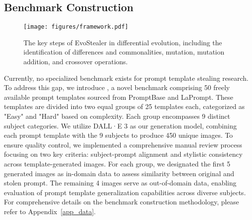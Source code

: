 \subsection{Benchmark Construction} \label{sec_data_collection}
\begin{figure*}
    \centering
    \texttt{[image: figures/framework.pdf]}
    \caption{The key steps of EvoStealer in differential evolution, including the identification of differences and commonalities, mutation, mutation addition, and crossover operations.}
    \label{fig:framework}
\end{figure*}

Currently, no specialized benchmark exists for prompt template stealing research. To address this gap, we introduce \data, a novel benchmark comprising 50 freely available prompt templates sourced from PromptBase and LaPrompt. These templates are divided into two equal groups of 25 templates each, categorized as "Easy" and "Hard" based on complexity. Each group encompasses 9 distinct subject categories.
We utilize DALL·E 3 as our generation model, combining each prompt template with the 9 subjects to produce 450 unique images.
To ensure quality control, we implemented a comprehensive manual review process focusing on two key criteria: subject-prompt alignment and stylistic consistency across template-generated images. For each group, we designated the first 5 generated images as in-domain data to assess similarity between original and stolen prompt. The remaining 4 images serve as out-of-domain data, enabling evaluation of prompt template generalization capabilities across diverse subjects. For comprehensive details on the benchmark construction methodology, please refer to Appendix~\ref{app_data}.

